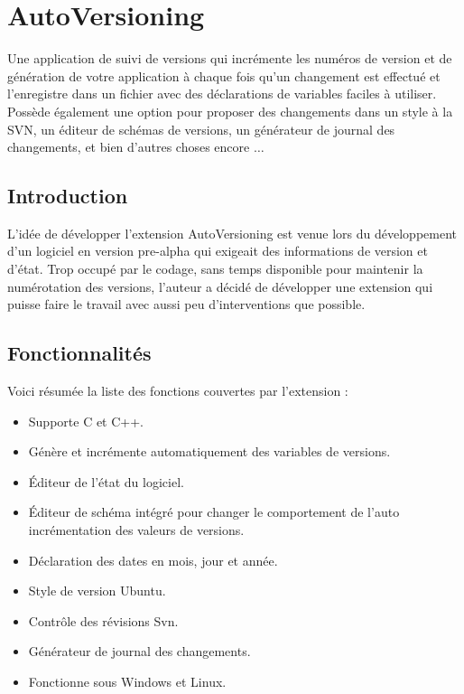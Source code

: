 \section{AutoVersioning}\label{sec:autoversioning}

Une application de suivi de versions qui incrémente les numéros de version et de génération de votre application à chaque fois qu'un changement est effectué et l'enregistre dans un fichier  avec des déclarations de variables faciles à utiliser. Possède également une option pour proposer des changements dans un style à la SVN, un éditeur de schémas de versions, un générateur de journal des changements, et bien d'autres choses encore $\ldots$

\subsection{Introduction}

L'idée de développer l'extension AutoVersioning est venue lors du développement d'un logiciel en version pre-alpha qui exigeait des informations de version et d'état. Trop occupé par le codage, sans temps disponible pour maintenir la numérotation des versions, l'auteur a décidé de développer une extension qui puisse faire le travail avec aussi peu d'interventions que possible.

\subsection{Fonctionnalités}

Voici résumée la liste des fonctions couvertes par l'extension :

\begin{itemize}
\item Supporte C et C++.
\item Génère et incrémente automatiquement des variables de versions.
\item Éditeur de l'état du logiciel.
\item Éditeur de schéma intégré pour changer le comportement de l'auto incrémentation des valeurs de versions.
\item Déclaration des dates en mois, jour et année.
\item Style de version Ubuntu.
\item Contrôle des révisions Svn.
\item Générateur de journal des changements.
\item Fonctionne sous Windows et Linux.
\end{itemize}

